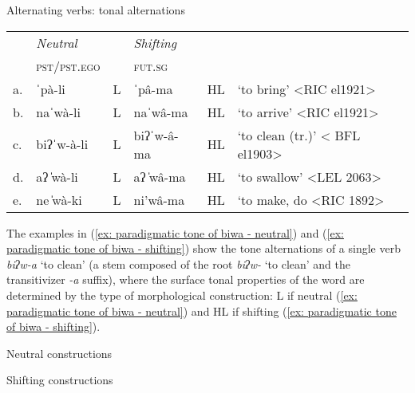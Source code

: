 \newpage
\ea\label{ex: paradigmatic tone examples}
{Alternating verbs: tonal alternations}\mbox{}

\begin{tabular}{llllll}
     & \textit{Neutral} & & \textit{Shifting} & & \\
     & \textsc{pst/pst.ego}	& & \textsc{fut.sg} & & \\
     a. & ˈpà-li & 	L &  ˈpâ-ma &	HL  &  	‘to bring’ 	<RIC el1921>\\
     b. & naˈwà-li   &	L  &	naˈwâ-ma &	HL &	‘to arrive’	<RIC el1921>\\
     c. & biʔˈw-à-li  &	L &   	biʔˈw-â-ma  &   HL &  	‘to clean (tr.)’ < BFL el1903>\\
     d. & aʔ ̍wà-li &   L & 	aʔ ̍wâ-ma &    HL  & 	`to swallow'	<LEL 2063>\\
     e. & ne ̍wà-ki &	L &	ni'wâ-ma &	HL &	‘to make, do	<RIC 1892>\\
\end{tabular}
    \z

The examples in (\ref{ex: paradigmatic tone of biwa - neutral}) and (\ref{ex: paradigmatic tone of biwa - shifting}) show the tone alternations of a single verb \textit{biʔw-a} ‘to clean’ (a stem composed of the root \textit{biʔw-} ‘to clean’ and the transitivizer \textit{-a} suffix), where the surface tonal properties of the word are determined by the type of morphological construction: L if neutral (\ref{ex: paradigmatic tone of biwa - neutral}) and HL if shifting (\ref{ex: paradigmatic tone of biwa - shifting}).

\ea\label{ex: paradigmatic tone of biwa - neutral}
{Neutral constructions}
    \z
\z

\ea\label{ex: paradigmatic tone of biwa - shifting}
{Shifting constructions}
	\z
\z

